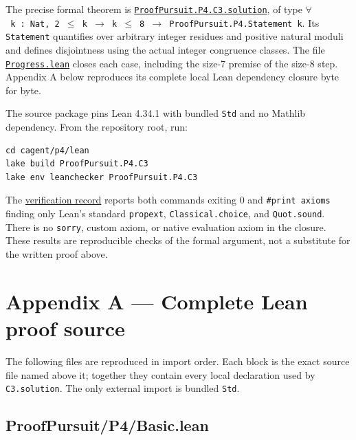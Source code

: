 \documentclass[11pt,a4paper]{article}
\begin{document}
The precise formal theorem is \href{https://github.com/mpelteshki/climbing-to-the-frontier/blob/212bba53b1818c08c40b8c4b48f636651eaf6410/cagent/p4/lean/ProofPursuit/P4/C3.lean}{\texttt{ProofPursuit.P4.C3.solution}}, of type \texttt{\ensuremath{\forall}\ k\ :\ Nat,\ 2\ \ensuremath{\leq}\ k\ \ensuremath{\to}\ k\ \ensuremath{\leq}\ 8\ \ensuremath{\to}\ ProofPursuit.P4.Statement\ k}. Its \texttt{Statement} quantifies over arbitrary integer residues and positive natural moduli and defines disjointness using the actual integer congruence classes. The file \href{https://github.com/mpelteshki/climbing-to-the-frontier/blob/212bba53b1818c08c40b8c4b48f636651eaf6410/cagent/p4/lean/ProofPursuit/P4/Progress.lean}{\texttt{Progress.lean}} closes each case, including the size-7 premise of the size-8 step. Appendix A below reproduces its complete local Lean dependency closure byte for byte.

The source package pins Lean 4.34.1 with bundled \texttt{Std} and no Mathlib dependency. From the repository root, run:

\begin{Verbatim}[breaklines,breakanywhere,fontsize=\footnotesize]
cd cagent/p4/lean
lake build ProofPursuit.P4.C3
lake env leanchecker ProofPursuit.P4.C3
\end{Verbatim}

The \href{https://github.com/mpelteshki/climbing-to-the-frontier/blob/212bba53b1818c08c40b8c4b48f636651eaf6410/cagent/p4/verification.md}{verification record} reports both commands exiting 0 and \texttt{\#print\ axioms} finding only Lean's standard \texttt{propext}, \texttt{Classical.choice}, and \texttt{Quot.sound}. There is no \texttt{sorry}, custom axiom, or native evaluation axiom in the closure. These results are reproducible checks of the formal argument, not a substitute for the written proof above.

\section{Appendix A --- Complete Lean proof source}\label{appendix-a-complete-lean-proof-source}

The following files are reproduced in import order. Each block is the exact source file named above it; together they contain every local declaration used by \texttt{C3.solution}. The only external import is bundled \texttt{Std}.

\subsection{ProofPursuit/P4/Basic.lean}\label{proofpursuitp4basic.lean}
\end{document}
